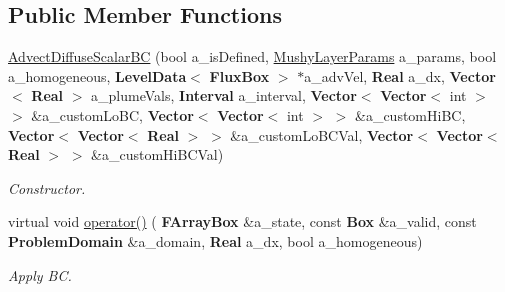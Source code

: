 \subsection*{Public Member Functions}
\begin{DoxyCompactItemize}
\item 
\mbox{\label{class_advect_diffuse_scalar_b_c_a2227cd96500613d5eb7918cc6fa3a645}} 
\hyperlink{class_advect_diffuse_scalar_b_c_a2227cd96500613d5eb7918cc6fa3a645}{Advect\+Diffuse\+Scalar\+BC} (bool a\+\_\+is\+Defined, \hyperlink{class_mushy_layer_params}{Mushy\+Layer\+Params} a\+\_\+params, bool a\+\_\+homogeneous, \textbf{ Level\+Data}$<$ \textbf{ Flux\+Box} $>$ $\ast$a\+\_\+adv\+Vel, \textbf{ Real} a\+\_\+dx, \textbf{ Vector}$<$ \textbf{ Real} $>$ a\+\_\+plume\+Vals, \textbf{ Interval} a\+\_\+interval, \textbf{ Vector}$<$ \textbf{ Vector}$<$ int $>$ $>$ \&a\+\_\+custom\+Lo\+BC, \textbf{ Vector}$<$ \textbf{ Vector}$<$ int $>$ $>$ \&a\+\_\+custom\+Hi\+BC, \textbf{ Vector}$<$ \textbf{ Vector}$<$ \textbf{ Real} $>$ $>$ \&a\+\_\+custom\+Lo\+B\+C\+Val, \textbf{ Vector}$<$ \textbf{ Vector}$<$ \textbf{ Real} $>$ $>$ \&a\+\_\+custom\+Hi\+B\+C\+Val)
\begin{DoxyCompactList}\small\item\em Constructor. \end{DoxyCompactList}\item 
\mbox{\label{class_advect_diffuse_scalar_b_c_ab55b1f2a27a3ff1ecda0d56acdbf0d77}} 
virtual void \hyperlink{class_advect_diffuse_scalar_b_c_ab55b1f2a27a3ff1ecda0d56acdbf0d77}{operator()} (\textbf{ F\+Array\+Box} \&a\+\_\+state, const \textbf{ Box} \&a\+\_\+valid, const \textbf{ Problem\+Domain} \&a\+\_\+domain, \textbf{ Real} a\+\_\+dx, bool a\+\_\+homogeneous)
\begin{DoxyCompactList}\small\item\em Apply BC. \end{DoxyCompactList}\end{DoxyCompactItemize}
